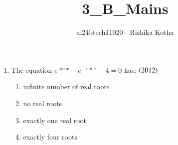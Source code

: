 \documentclass[journal,12pt,twocolumn]{IEEEtran}
\theoremstyle{remark}
\begin{document}

\vspace{3cm}

\title{3\_B\_Mains}
\author{ai24btech11020 - Rishika Kotha}

\maketitle
\bigskip       
\renewcommand{\thefigure}{\theenumi}
\renewcommand{\thetable}{\theenumi}

\begin{enumerate}[start=24]
\item The equation $e^{\sin x}-e^{-\sin x}-4=0$ has:
	\hfill$\left(2012\right)$\\
	\begin{enumerate}[label=\alph*.]
	\item  infinite number of real roots
	\item  no real roots
	\item  exactly one real root
	\item  exactly four roots
	\end{enumerate}


\end{enumerate}
\end{document}
